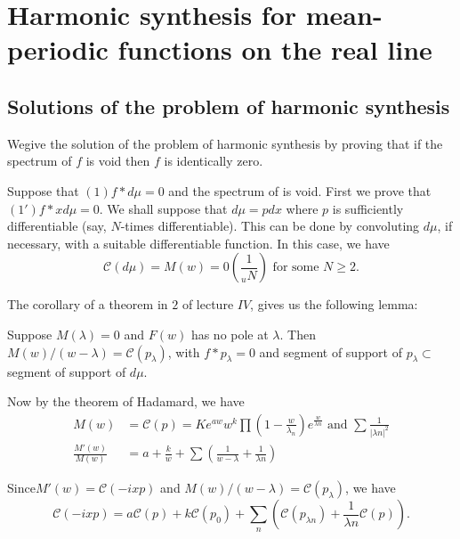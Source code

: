 \chapter[Harmonic synthesis for mean-periodic functions...]{Harmonic synthesis for mean-periodic functions
 on the real line}\label{chap5}%

\section{Solutions of the problem of harmonic
  synthesis}\label{chap5:sec1}%

We\pageoriginale give the solution of the problem of harmonic
synthesis by proving 
that if the spectrum of $f$ is void then $f$ is identically zero. 

Suppose that $(1) f * d \mu = 0$ and the spectrum of is void. First we
prove that $(1') f * xd \mu =0$. We shall suppose that $d \mu = pdx$
where $p$ is sufficiently differentiable (say, $N$-times
differentiable). This can be done by convoluting $d \mu$, if
necessary, with a suitable differentiable function. In this case, we
have 
$$
\mathscr{C} (d \mu) = M(w) = 0\left(\frac{1}{_uN}\right) \text{ for some }
N \geq 2. 
$$

The corollary of a theorem in $2$ of lecture $IV$, gives us the following lemma:
\begin{lemma*}
 Suppose $M(\lambda ) = 0$ and $F(w)$ has no pole at $\lambda$. Then
 $M(w)/ (w - \lambda ) = \mathscr{C} (p_\lambda )$, with $f *
 p_\lambda = 0$ and segment of support of $p_\lambda \subset$ segment
 of support of $d \mu$. 
\end{lemma*}

Now by the theorem of Hadamard, we have
\begin{align*}
 M(w) &= \mathscr{C}(p) = K e^{a w} w^k \prod \left(1- \frac{w}{\lambda_n}
 \right) e^{\frac{w}{\lambda n}} \text{ and } \sum \frac{1}{| \lambda n|^2}
 \\ 
 \frac{M' (w)}{M(w)} & = a + \frac{k}{w} + \sum \left(\frac{1}{w - \lambda}
 + \frac{1}{\lambda n}\right) 
\end{align*}

Since\pageoriginale $M'(w) = \mathscr{C} (-ixp)$ and $M(w) / (w - \lambda) =
\mathscr{C}(p_\lambda)$, we have 
\begin{equation}
 \mathscr{C} (- ixp ) = a \mathscr{C} (p) + k \mathscr{C} (p_0)
 +\sum_n (\mathscr{C}(p_{ \lambda n}) + \frac{1}{\lambda n}
 \mathscr{C} (p)). \tag{*} 
\end{equation}

